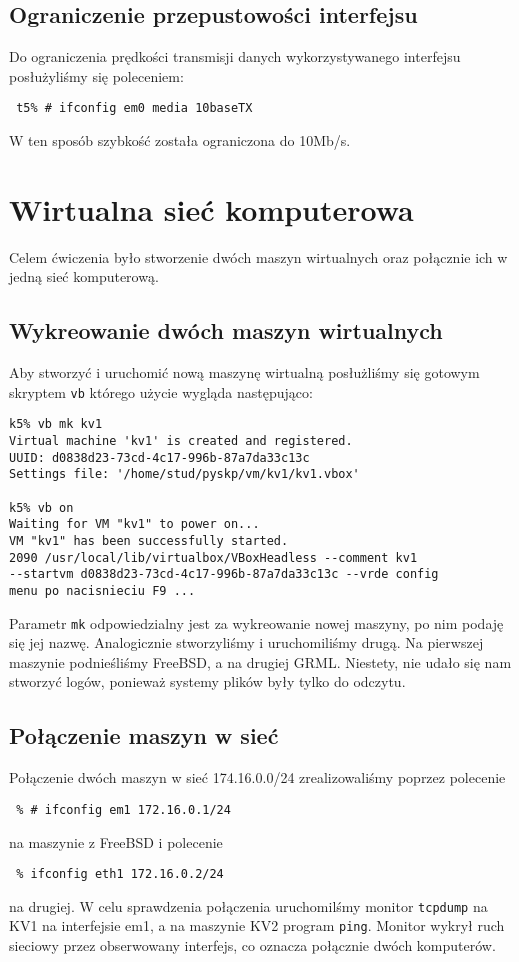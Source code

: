 \documentclass[a4paper,11pt,notitlepage]{article}
\begin{document}
\subsection{Ograniczenie przepustowości interfejsu}
Do ograniczenia prędkości transmisji danych wykorzystywanego interfejsu posłużyliśmy się poleceniem:
\begin{verbatim}
 t5% # ifconfig em0 media 10baseTX  
\end{verbatim}
W ten sposób szybkość została ograniczona do 10Mb/s.

\section{Wirtualna sieć komputerowa}
Celem ćwiczenia było stworzenie dwóch maszyn wirtualnych oraz połącznie ich w jedną sieć komputerową.

\subsection{Wykreowanie dwóch maszyn wirtualnych}
Aby stworzyć i uruchomić nową maszynę wirtualną posłużliśmy się gotowym skryptem \verb+vb+ którego użycie wygląda następująco: 
\begin{verbatim}
k5% vb mk kv1
Virtual machine 'kv1' is created and registered.
UUID: d0838d23-73cd-4c17-996b-87a7da33c13c
Settings file: '/home/stud/pyskp/vm/kv1/kv1.vbox'

k5% vb on
Waiting for VM "kv1" to power on...
VM "kv1" has been successfully started.
2090 /usr/local/lib/virtualbox/VBoxHeadless --comment kv1 
--startvm d0838d23-73cd-4c17-996b-87a7da33c13c --vrde config
menu po nacisnieciu F9 ...
\end{verbatim}
Parametr \verb+mk+ odpowiedzialny jest za wykreowanie nowej maszyny, po nim podaję się jej nazwę. Analogicznie stworzyliśmy i uruchomiliśmy drugą. Na pierwszej maszynie podnieśliśmy FreeBSD, a na drugiej GRML. 
Niestety, nie udało się nam stworzyć logów, ponieważ systemy plików były tylko do odczytu.

\subsection{Połączenie maszyn w sieć}
Połączenie dwóch maszyn w sieć 174.16.0.0/24 zrealizowaliśmy poprzez polecenie 
\begin{verbatim}
 % # ifconfig em1 172.16.0.1/24
\end{verbatim}
na maszynie z FreeBSD i polecenie 
\begin{verbatim}
 % ifconfig eth1 172.16.0.2/24
\end{verbatim}
na drugiej. W celu sprawdzenia połączenia uruchomilśmy monitor \verb+tcpdump+ na KV1 na interfejsie em1, a na maszynie KV2 program \verb+ping+. 
Monitor wykrył ruch sieciowy przez obserwowany interfejs, co oznacza połącznie dwóch komputerów.
\end{document}
